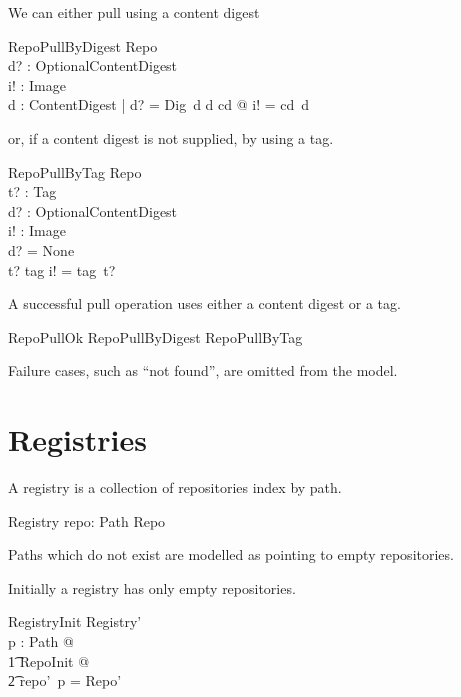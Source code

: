 \documentclass[a4paper,twoside,12pt]{article}
\begin{document}
We can either pull using a content digest
\begin{schema}{RepoPullByDigest}
  \Xi Repo \\
  d? : OptionalContentDigest \\
  i! : Image \\
\where
  \exists d : ContentDigest | d? = Dig~d  \land d \in \dom cd @ i! = cd~d \\
\end{schema}

or, if a content digest is not supplied, by using a tag.
\begin{schema}{RepoPullByTag}
  \Xi Repo \\
  t? : Tag \\
  d? : OptionalContentDigest \\
  i! : Image \\
\where
  d? = None \\
  t? \in \dom tag \implies i! = tag~t? \\
\end{schema}

\begin{samepage}
A successful pull operation uses either a content digest or a tag.
\begin{zed}
  RepoPullOk  RepoPullByDigest \lor RepoPullByTag
\end{zed}
Failure cases, such as ``not found'', are omitted from the model.
\end{samepage}

\newpage
\section{Registries}

A registry is a collection of repositories index by path.
\begin{schema}{Registry}
    repo: Path \fun Repo \\
\end{schema}
Paths which do not exist are modelled as pointing to empty repositories.

Initially a registry has only empty repositories.
\begin{schema}{RegistryInit}
  Registry' \\
\where
  \forall p : Path @ \\
  \t1 \exists RepoInit @ \\
  \t2 repo'~p = \theta Repo' \\
\end{schema}
\end{document}

